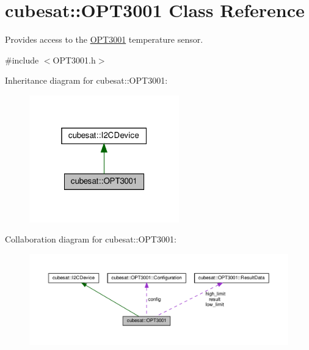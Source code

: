 \hypertarget{classcubesat_1_1OPT3001}{}\section{cubesat\+:\+:O\+P\+T3001 Class Reference}
\label{classcubesat_1_1OPT3001}


Provides access to the \hyperlink{classcubesat_1_1OPT3001}{O\+P\+T3001} temperature sensor.  




{\ttfamily \#include $<$O\+P\+T3001.\+h$>$}



Inheritance diagram for cubesat\+:\+:O\+P\+T3001\+:\nopagebreak
\begin{figure}[H]
\begin{center}
\leavevmode
\includegraphics[width=184pt]{classcubesat_1_1OPT3001__inherit__graph}
\end{center}
\end{figure}


Collaboration diagram for cubesat\+:\+:O\+P\+T3001\+:\nopagebreak
\begin{figure}[H]
\begin{center}
\leavevmode
\includegraphics[width=350pt]{classcubesat_1_1OPT3001__coll__graph}
\end{center}
\end{figure}
